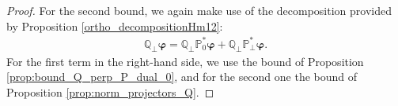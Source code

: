 \documentclass[]{article}
\newtheorem{lemma}{Lemma}
\numberwithin{equation}{section}
\numberwithin{theorem}{section}
\numberwithin{lemma}{section}
\numberwithin{corollary}{section}
\numberwithin{proposition}{section}
\numberwithin{definition}{section}
\newcommand{\re}{\varepsilon}
\renewcommand{\O}{\mathcal{O}}
\begin{document}
\begin{appendices}
\begin{proof}
			For the second bound, we again make use  of the decomposition provided by Proposition \ref{ortho_decompositionHm12}:
			\begin{align*}%
				\mathbb{Q}_{\perp}\boldsymbol{\varphi}=\mathbb{Q}_{\perp}\mathbb{P}_0^*\boldsymbol{\varphi}+\mathbb{Q}_{\perp}\mathbb{P}_{\perp}^*\boldsymbol{\varphi}.
			\end{align*}
			For the first term in the right-hand side, we use the bound of Proposition \ref{prop:bound_Q_perp_P_dual_0}, and for the second one the bound of Proposition \ref{prop:norm_projectors_Q}. 
		\end{proof}

\end{appendices}
\end{document}

